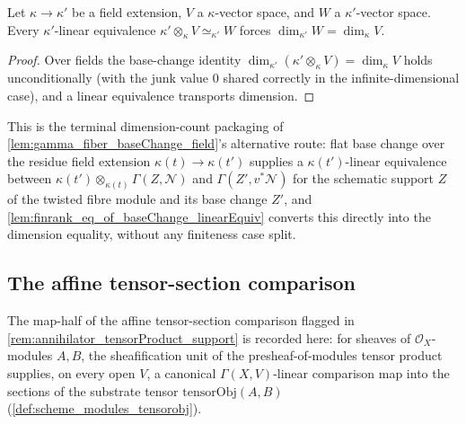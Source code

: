 \begin{lemma}
  \label{lem:finrank_eq_of_baseChange_linearEquiv}
  Let \(\kappa \to \kappa'\) be a field extension, \(V\) a \(\kappa\)-vector
  space, and \(W\) a \(\kappa'\)-vector space. Every \(\kappa'\)-linear
  equivalence \(\kappa' \otimes_\kappa V \simeq_{\kappa'} W\) forces
  \(\dim_{\kappa'} W = \dim_\kappa V\).
\end{lemma}
\begin{proof}\leanok
  Over fields the base-change identity
  \(\dim_{\kappa'}(\kappa' \otimes_\kappa V) = \dim_\kappa V\) holds
  unconditionally (with the junk value \(0\) shared correctly in the
  infinite-dimensional case), and a linear equivalence transports dimension.
\end{proof}

\begin{remark}
  \label{rem:finrank_baseChange_linearEquiv_role}
  This is the terminal dimension-count packaging of
  \cref{lem:gamma_fiber_baseChange_field}'s alternative route: flat base
  change over the residue field extension \(\kappa(t) \to \kappa(t')\)
  supplies a \(\kappa(t')\)-linear equivalence between
  \(\kappa(t') \otimes_{\kappa(t)} \Gamma(Z, \mathcal N)\) and
  \(\Gamma(Z', v^*\mathcal N)\) for the schematic support \(Z\) of the
  twisted fibre module and its base change \(Z'\), and
  \cref{lem:finrank_eq_of_baseChange_linearEquiv} converts this directly into
  the dimension equality, without any finiteness case split.
\end{remark}

\subsection{The affine tensor-section comparison}
\label{subsec:tensor_section_formula}

The map-half of the affine tensor-section comparison flagged in
\cref{rem:annihilator_tensorProduct_support} is recorded here: for sheaves
of \(\mathcal O_X\)-modules \(A, B\), the sheafification unit of the
presheaf-of-modules tensor product supplies, on every open \(V\), a
canonical \(\Gamma(X,V)\)-linear comparison map into the sections of the
substrate tensor \(\mathrm{tensorObj}(A,B)\) (\cref{def:scheme_modules_tensorobj}).

